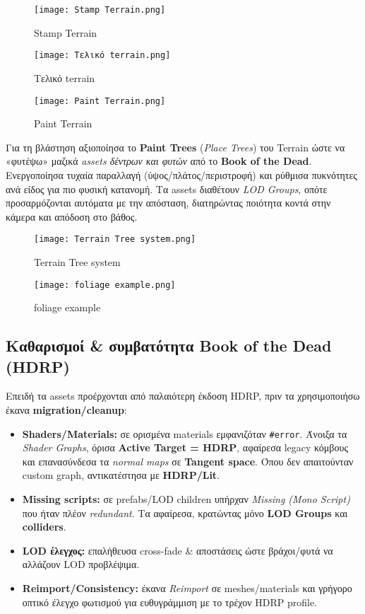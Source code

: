\begin{figure}[H]
    \centering
    \texttt{[image: Stamp Terrain.png]}
    \caption{Stamp Terrain}
    \label{fig:placeholder}
\end{figure}
\begin{figure}[H]
    \centering
    \texttt{[image: Τελικό terrain.png]}
    \caption{Τελικό terrain}
    \label{fig:placeholder}
\end{figure}
\begin{figure}[H]
    \centering
    \texttt{[image: Paint Terrain.png]}
    \caption{Paint Terrain}
    \label{fig:placeholder}
\end{figure}
Για τη βλάστηση αξιοποίησα το \textbf{Paint Trees} (\emph{Place Trees}) του Terrain ώστε να «φυτέψω» μαζικά \textit{assets δέντρων και φυτών} από το \textbf{Book of the Dead}. Ενεργοποίησα τυχαία παραλλαγή (ύψος/πλάτος/περιστροφή) και ρύθμισα πυκνότητες ανά είδος για πιο φυσική κατανομή. Τα assets διαθέτουν \textit{LOD Groups}, οπότε προσαρμόζονται αυτόματα με την απόσταση, διατηρώντας ποιότητα κοντά στην κάμερα και απόδοση στο βάθος.

\begin{figure}[H]
    \centering
    \texttt{[image: Terrain Tree system.png]}
    \caption{Terrain Tree system}
    \label{fig:placeholder}
\end{figure}
\begin{figure}[H]
    \centering
    \texttt{[image: foliage example.png]}
    \caption{foliage example}
    \label{fig:placeholder}
\end{figure}


\subsection*{Καθαρισμοί \& συμβατότητα Book of the Dead (HDRP)}
Επειδή τα assets προέρχονται από παλαιότερη έκδοση HDRP, πριν τα χρησιμοποιήσω έκανα \textbf{migration/cleanup}:
\begin{itemize}
  \item \textbf{Shaders/Materials:} σε ορισμένα materials εμφανιζόταν \texttt{\#error}. Άνοιξα τα \emph{Shader Graphs}, όρισα \textbf{Active Target = HDRP}, αφαίρεσα legacy κόμβους και επανασύνδεσα τα \emph{normal maps} σε \textbf{Tangent space}. Όπου δεν απαιτούνταν custom graph, αντικατέστησα με \textbf{HDRP/Lit}.
  \item \textbf{Missing scripts:} σε prefabs/LOD children υπήρχαν \emph{Missing (Mono Script)} που ήταν πλέον \emph{redundant}. Τα αφαίρεσα, κρατώντας μόνο \textbf{LOD Groups} και \textbf{colliders}.
  \item \textbf{LOD έλεγχος:} επαλήθευσα cross-fade \& αποστάσεις ώστε βράχοι/φυτά να αλλάζουν LOD προβλέψιμα.
  \item \textbf{Reimport/Consistency:} έκανα \emph{Reimport} σε meshes/materials και γρήγορο οπτικό έλεγχο φωτισμού για ευθυγράμμιση με το τρέχον HDRP profile.
\end{itemize}

